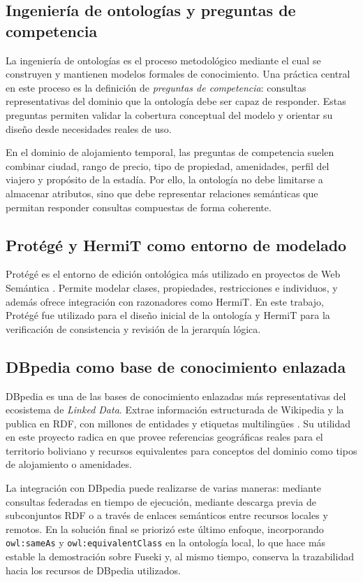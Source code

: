 \subsection{Ingeniería de ontologías y preguntas de competencia}

La ingeniería de ontologías es el proceso metodológico mediante el cual se construyen y
mantienen modelos formales de conocimiento. Una práctica central en este proceso es la
definición de \textit{preguntas de competencia}: consultas representativas del dominio
que la ontología debe ser capaz de responder. Estas preguntas permiten validar la
cobertura conceptual del modelo y orientar su diseño desde necesidades reales de uso.

En el dominio de alojamiento temporal, las preguntas de competencia suelen combinar
ciudad, rango de precio, tipo de propiedad, amenidades, perfil del viajero y propósito
de la estadía. Por ello, la ontología no debe limitarse a almacenar atributos, sino que
debe representar relaciones semánticas que permitan responder consultas compuestas de
forma coherente.

\subsection{Protégé y HermiT como entorno de modelado}

Protégé es el entorno de edición ontológica más utilizado en proyectos de Web
Semántica \parencite{musen2015}. Permite modelar clases, propiedades, restricciones e
individuos, y además ofrece integración con razonadores como HermiT. En este trabajo,
Protégé fue utilizado para el diseño inicial de la ontología y HermiT para la
verificación de consistencia y revisión de la jerarquía lógica.

\subsection{DBpedia como base de conocimiento enlazada}

DBpedia es una de las bases de conocimiento enlazadas más representativas del ecosistema
de \textit{Linked Data}. Extrae información estructurada de Wikipedia y la publica en
RDF, con millones de entidades y etiquetas multilingües \parencite{lehmann2015}. Su
utilidad en este proyecto radica en que provee referencias geográficas reales para el
territorio boliviano y recursos equivalentes para conceptos del dominio como tipos de
alojamiento o amenidades.

La integración con DBpedia puede realizarse de varias maneras: mediante consultas
federadas en tiempo de ejecución, mediante descarga previa de subconjuntos RDF o a
través de enlaces semánticos entre recursos locales y remotos. En la solución final se
priorizó este último enfoque, incorporando \texttt{owl:sameAs} y
\texttt{owl:equivalentClass} en la ontología local, lo que hace más estable la
demostración sobre Fuseki y, al mismo tiempo, conserva la trazabilidad hacia los
recursos de DBpedia utilizados.

